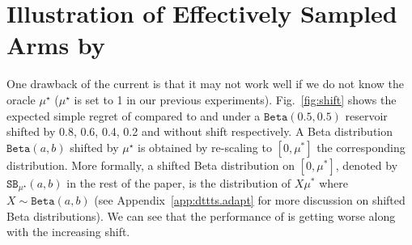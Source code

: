 \section{Illustration of Effectively Sampled Arms by \texorpdfstring{\DTTTS}{}}\label{app:dttts.arms}

One drawback of the current \DTTTS is that it may not work well if we do not know the oracle $\mu^\star$ ($\mu^\star$ is set to 1 in our previous experiments). Fig.~\ref{fig:shift} shows the expected simple regret of \DTTTS compared to \ISHA and \TTTS under a $\texttt{Beta}(0.5,0.5)$ reservoir shifted by 0.8, 0.6, 0.4, 0.2 and without shift respectively. A Beta distribution $\texttt{Beta}(a,b)$ shifted by $\mu^\star$ is obtained by re-scaling to $[0,\mu^*]$ the corresponding distribution. More formally, a shifted Beta distribution on $[0,\mu^*]$, denoted by  $\texttt{SB}_{\mu^\star}(a,b)$ in the rest of the paper, is the distribution of $X\mu^*$ where $X \sim \texttt{Beta}(a,b)$ (see Appendix~\ref{app:dttts.adapt} for more discussion on shifted Beta distributions). We can see that the performance of \DTTTS is getting worse along with the increasing shift.


